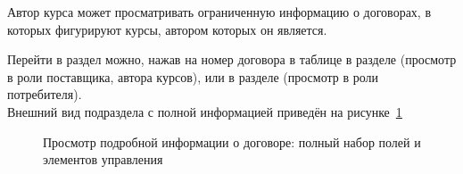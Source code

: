Автор курса может просматривать ограниченную информацию о договорах, в которых фигурируют курсы, автором которых он является.

Перейти в раздел можно, нажав на номер договора в таблице в разделе  (просмотр в роли поставщика, автора курсов), или в разделе  (просмотр в роли потребителя). \\
Внешний вид подраздела с полной информацией приведён на рисунке~\ref{agreement:detail}
	
	\begin{figure}[H]
	\caption{Просмотр подробной информации о договоре: полный набор полей и элементов управления}
	\label{agreement:detail}
	\end{figure}


